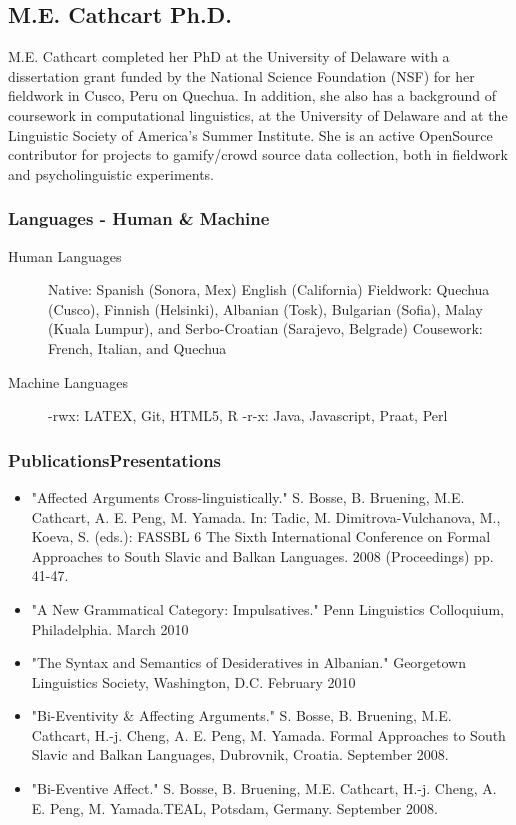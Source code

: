 \documentclass[12 pt]{article}
\begin{document}
\subsection{M.E. Cathcart Ph.D.}

M.E. Cathcart completed her PhD at the University of Delaware with a dissertation grant funded by the National Science Foundation (NSF) for her fieldwork in Cusco, Peru on Quechua. In addition, she also has a background of coursework in computational linguistics, at the University of Delaware and at the Linguistic Society of America's Summer Institute. She is an active OpenSource contributor for projects to gamify/crowd source data collection, both in fieldwork and psycholinguistic experiments.


\subsubsection{Languages - Human \& Machine}
\begin{description}
\item [
Human Languages] Native: Spanish (Sonora, Mex) English (California) Fieldwork: Quechua (Cusco), Finnish (Helsinki), Albanian (Tosk), Bulgarian (Sofia), Malay (Kuala Lumpur), and Serbo-Croatian (Sarajevo, Belgrade) Cousework: French, Italian, and Quechua
\item [
Machine Languages] -rwx: LATEX, Git, HTML5, R -r-x: Java, Javascript, Praat, Perl

\end{description}


\subsubsection{PublicationsPresentations}

\begin{itemize}
\item "Affected Arguments Cross-linguistically." S. Bosse, B. Bruening, M.E. Cathcart, A. E. Peng, M. Yamada. In: Tadic, M. Dimitrova-Vulchanova, M., Koeva, S. (eds.): FASSBL 6 The Sixth International Conference on Formal Approaches to South Slavic and Balkan Languages. 2008 (Proceedings) pp. 41-47.
\item "A New Grammatical Category: Impulsatives." Penn Linguistics Colloquium, Philadelphia. March 2010
\item"The Syntax and Semantics of Desideratives in Albanian." Georgetown Linguistics Society, Washington, D.C. February 2010
\item "Bi-Eventivity \& Affecting Arguments." S. Bosse, B. Bruening, M.E. Cathcart, H.-j. Cheng, A. E. Peng, M. Yamada. Formal Approaches to South Slavic and Balkan Languages, Dubrovnik, Croatia. September 2008.
\item "Bi-Eventive Affect." S. Bosse, B. Bruening, M.E. Cathcart, H.-j. Cheng, A. E. Peng, M. Yamada.TEAL, Potsdam, Germany. September 2008.
\end{itemize}
\end{document}
